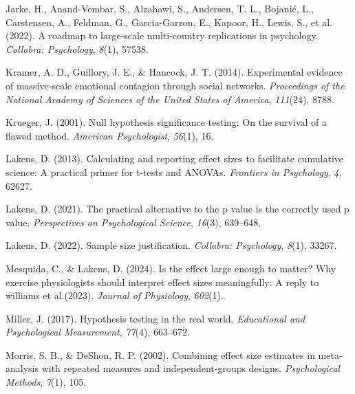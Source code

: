 \documentclass[
  man,floatsintext]{apa7}
\newlength{\cslhangindent}
\newlength{\cslentryspacingunit} %
\newenvironment{CSLReferences}[2] %
 {%
  \setlength{\parindent}{0pt}
  \ifodd #1
  \let\oldpar\par
  \def\par{\hangindent=\cslhangindent\oldpar}
  \fi
  \setlength{\parskip}{#2\cslentryspacingunit}
 }%
 {}
\begin{document}
\begin{CSLReferences}{1}{0}
\leavevmode{}%
Jarke, H., Anand-Vembar, S., Alzahawi, S., Andersen, T. L., Bojanić, L., Carstensen, A., Feldman, G., Garcia-Garzon, E., Kapoor, H., Lewis, S., et al. (2022). A roadmap to large-scale multi-country replications in psychology. \emph{Collabra: Psychology}, \emph{8}(1), 57538.

\leavevmode{}%
Kramer, A. D., Guillory, J. E., \& Hancock, J. T. (2014). Experimental evidence of massive-scale emotional contagion through social networks. \emph{Proceedings of the National Academy of Sciences of the United States of America}, \emph{111}(24), 8788.

\leavevmode{}%
Krueger, J. (2001). Null hypothesis significance testing: On the survival of a flawed method. \emph{American Psychologist}, \emph{56}(1), 16.

\leavevmode{}%
Lakens, D. (2013). Calculating and reporting effect sizes to facilitate cumulative science: A practical primer for t-tests and ANOVAs. \emph{Frontiers in Psychology}, \emph{4}, 62627.

\leavevmode{}%
Lakens, D. (2021). The practical alternative to the p value is the correctly used p value. \emph{Perspectives on Psychological Science}, \emph{16}(3), 639--648.

\leavevmode{}%
Lakens, D. (2022). Sample size justification. \emph{Collabra: Psychology}, \emph{8}(1), 33267.

\leavevmode{}%
Mesquida, C., \& Lakens, D. (2024). Is the effect large enough to matter? Why exercise physiologists should interpret effect sizes meaningfully: A reply to williams et al.(2023). \emph{Journal of Physiology}, \emph{602}(1).

\leavevmode{}%
Miller, J. (2017). Hypothesis testing in the real world. \emph{Educational and Psychological Measurement}, \emph{77}(4), 663--672.

\leavevmode{}%
Morris, S. B., \& DeShon, R. P. (2002). Combining effect size estimates in meta-analysis with repeated measures and independent-groups designs. \emph{Psychological Methods}, \emph{7}(1), 105.


\end{CSLReferences}
\end{document}
